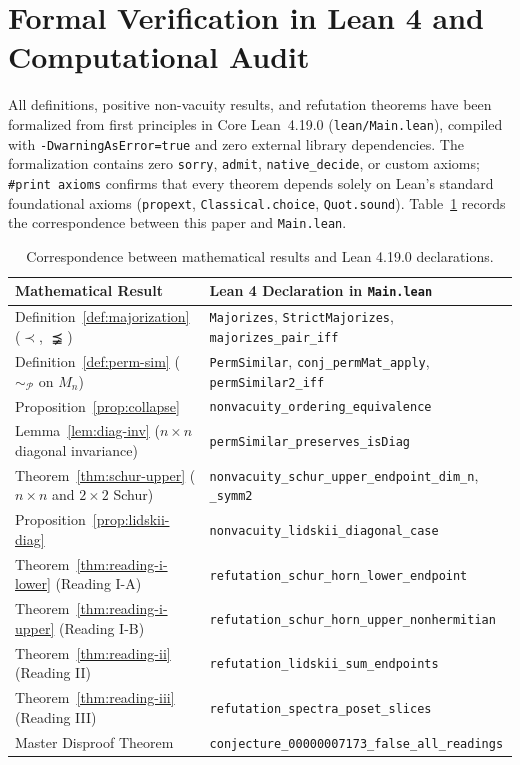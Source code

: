 \documentclass[11pt]{article}
\theoremstyle{definition}
\theoremstyle{remark}
\begin{document}
\section{Formal Verification in Lean 4 and Computational Audit}
\label{sec:lean}

All definitions, positive non-vacuity results, and refutation theorems have been
formalized from first principles in Core Lean~4.19.0 (\texttt{lean/Main.lean}),
compiled with \texttt{-DwarningAsError=true} and zero external library
dependencies. The formalization contains zero \texttt{sorry}, \texttt{admit},
\texttt{native\_decide}, or custom axioms; \texttt{\#print axioms} confirms that
every theorem depends solely on Lean's standard foundational axioms
(\texttt{propext}, \texttt{Classical.choice}, \texttt{Quot.sound}).
Table~\ref{tab:lean-map} records the correspondence between this paper and
\texttt{Main.lean}.

\begin{table}[ht]
\centering
\caption{Correspondence between mathematical results and Lean 4.19.0 declarations.}
\label{tab:lean-map}
\vspace{4pt}
{\small
\begin{tabular}{p{2.25in}p{3.65in}}
\hline
\textbf{Mathematical Result} & \textbf{Lean 4 Declaration in \texttt{Main.lean}} \\
\hline
Definition~\ref{def:majorization} ($\prec$, $\precneqq$) &
  \texttt{Majorizes}, \texttt{StrictMajorizes}, \texttt{majorizes\_pair\_iff} \\
Definition~\ref{def:perm-sim} ($\sim_{\mathcal{P}}$ on $M_n$) &
  \texttt{PermSimilar}, \texttt{conj\_permMat\_apply}, \texttt{permSimilar2\_iff} \\
Proposition~\ref{prop:collapse} &
  \texttt{nonvacuity\_ordering\_equivalence} \\
Lemma~\ref{lem:diag-inv} ($n \times n$ diagonal invariance) &
  \texttt{permSimilar\_preserves\_isDiag} \\
Theorem~\ref{thm:schur-upper} ($n \times n$ and $2 \times 2$ Schur) &
  \texttt{nonvacuity\_schur\_upper\_endpoint\_dim\_n}, \texttt{\_symm2} \\
Proposition~\ref{prop:lidskii-diag} &
  \texttt{nonvacuity\_lidskii\_diagonal\_case} \\
Theorem~\ref{thm:reading-i-lower} (Reading I-A) &
  \texttt{refutation\_schur\_horn\_lower\_endpoint} \\
Theorem~\ref{thm:reading-i-upper} (Reading I-B) &
  \texttt{refutation\_schur\_horn\_upper\_nonhermitian} \\
Theorem~\ref{thm:reading-ii} (Reading II) &
  \texttt{refutation\_lidskii\_sum\_endpoints} \\
Theorem~\ref{thm:reading-iii} (Reading III) &
  \texttt{refutation\_spectra\_poset\_slices} \\
Master Disproof Theorem &
  \texttt{conjecture\_00000007173\_false\_all\_readings} \\
\hline
\end{tabular}
}
\end{table}
\end{document}
